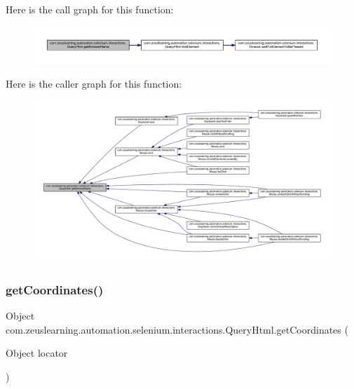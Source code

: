 Here is the call graph for this function\+:
\nopagebreak
\begin{figure}[H]
\begin{center}
\leavevmode
\includegraphics[width=350pt]{dc/d41/classcom_1_1zeuslearning_1_1automation_1_1selenium_1_1interactions_1_1QueryHtml_a2a5f98d1135bb2e136ed1a6acef3f21f_cgraph}
\end{center}
\end{figure}
Here is the caller graph for this function\+:
\nopagebreak
\begin{figure}[H]
\begin{center}
\leavevmode
\includegraphics[width=350pt]{dc/d41/classcom_1_1zeuslearning_1_1automation_1_1selenium_1_1interactions_1_1QueryHtml_a2a5f98d1135bb2e136ed1a6acef3f21f_icgraph}
\end{center}
\end{figure}
\hypertarget{classcom_1_1zeuslearning_1_1automation_1_1selenium_1_1interactions_1_1QueryHtml_a52ce1e529bfd5416349e82671c33e480}{}\label{classcom_1_1zeuslearning_1_1automation_1_1selenium_1_1interactions_1_1QueryHtml_a52ce1e529bfd5416349e82671c33e480} 
\subsubsection{\texorpdfstring{get\+Coordinates()}{getCoordinates()}}
{\footnotesize\ttfamily Object com.\+zeuslearning.\+automation.\+selenium.\+interactions.\+Query\+Html.\+get\+Coordinates (\begin{DoxyParamCaption}\item[{Object}]{locator }\end{DoxyParamCaption})\hspace{0.3cm}{\ttfamily [inline]}}

